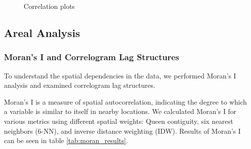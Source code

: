 \documentclass[10pt,journal,compsoc]{IEEEtran}
\begin{document}
\begin{figure}[t]
    \caption{Correlation plots}
    \label{fig:corr}
\end{figure}

\subsection{Areal Analysis}

\subsubsection{Moran's I and Correlogram Lag Structures}

To understand the spatial dependencies in the data, we performed Moran's I analysis and examined correlogram lag structures.

Moran's I is a measure of spatial autocorrelation, indicating the degree to which a variable is similar to itself in nearby locations. We calculated Moran's I for various metrics using different spatial weights: Queen contiguity, six nearest neighbors (6-NN), and inverse distance weighting (IDW). Results of Moran's I can be seen in table \ref{tab:moran_results}.
\end{document}
